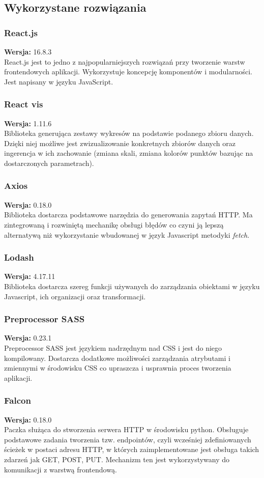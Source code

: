 \documentclass[eng,printmode]{mgr}
\begin{document}
\subsection{Wykorzystane rozwiązania}
\subsubsection{React.js}
\small \textbf{Wersja:} 16.8.3\\
React.js \cite{react} jest to jedno z najpopularniejszych rozwiązań przy tworzenie warstw frontendowych aplikacji. Wykorzystuje koncepcję komponentów i modularności. Jest napisany w języku JavaScript.
\subsubsection{React vis}
\small \textbf{Wersja:} 1.11.6\\
Biblioteka generująca zestawy wykresów na podstawie podanego zbioru danych. Dzięki niej możliwe jest zwizualizowanie konkretnych zbiorów danych oraz ingerencja w ich zachowanie (zmiana skali, zmiana kolorów punktów bazując na dostarczonych parametrach).
\subsubsection{Axios}
\small \textbf{Wersja:} 0.18.0\\
Biblioteka dostarcza podstawowe narzędzia do generowania zapytań HTTP. Ma zintegrowaną i rozwiniętą mechanikę obsługi błędów co czyni ją lepszą alternatywą niż wykorzystanie wbudowanej  w język Javascript metodyki \textit{fetch}.
\subsubsection{Lodash}
\small \textbf{Wersja:} 4.17.11\\
Biblioteka dostarcza szereg funkcji używanych do zarządzania obiektami w języku Javascript, ich organizacji oraz transformacji.
\subsubsection{Preprocessor SASS}
\small \textbf{Wersja:} 0.23.1\\
Preprocessor SASS jest językiem nadrzędnym nad CSS i jest do niego kompilowany. Dostarcza dodatkowe możliwości zarządzania atrybutami i zmiennymi w środowisku CSS co upraszcza i usprawnia proces tworzenia aplikacji.
\subsubsection{Falcon}
\small \textbf{Wersja:} 0.18.0\\
Paczka służąca do stworzenia serwera HTTP w środowisku python. Obsługuje podstawowe zadania tworzenia tzw. endpointów, czyli wcześniej zdefiniowanych ścieżek w postaci adresu HTTP, w których zaimplementowane jest obsługa takich zdarzeń jak GET, POST, PUT. Mechanizm ten jest wykorzystywany do komunikacji z warstwą frontendową.
\end{document}
